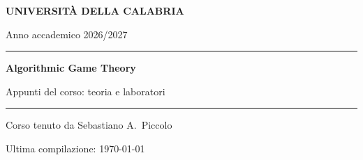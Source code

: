 \documentclass[11pt, a4paper, oneside, openany]{book}
\begin{document}
\frontmatter

\hypersetup{pageanchor=false}
\begin{titlepage}
  \centering
  \vspace*{3cm}
  {\sffamily\bfseries\color{unical}\large UNIVERSITÀ DELLA CALABRIA\par}
  \vspace{0.3cm}
  {\sffamily\color{grigio}Anno accademico 2026/2027\par}
  \vspace{2.5cm}
  {\color{blu}\rule{\linewidth}{1.2pt}\par}
  \vspace{0.6cm}
  {\sffamily\bfseries\Huge\color{blu} Algorithmic Game Theory\par}
  \vspace{0.4cm}
  {\sffamily\Large Appunti del corso: teoria e laboratori\par}
  \vspace{0.6cm}
  {\color{blu}\rule{\linewidth}{1.2pt}\par}
  \vspace{1.5cm}
  {\large Corso tenuto da Sebastiano A.\ Piccolo\par}
  \vfill
  {\small\color{grigio} Ultima compilazione: \today\par}
\end{titlepage}
\hypersetup{pageanchor=true}

\tableofcontents

\mainmatter








\end{document}
